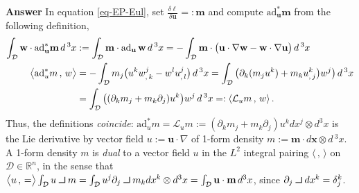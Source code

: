 \documentclass[11pt, oneside]{article}   	%
\def\contract{\makebox[1.2em][c]{\mbox{\rule{.6em}
{.01truein}\rule{.01truein}{.6em}}}}
\numberwithin{equation}{section}
\theoremstyle{plain}
\theoremstyle{definition}
\theoremstyle{remark}
\newcommand{\<}{\langle}
\renewcommand{\>}{\rangle}
\newcommand{\scp}[2]{{\big\langle {#1}\, , \, {#2}\big\rangle}}
\begin{document}
\textbf{Answer}
In equation \eqref{eq-EP-Eul}, set $\frac{\delta \ell}{\delta \mathbf{u}}=: \mathbf{m}$ and compute $\mathrm{ad}^*_{\mathbf{u}} \mathbf{m} $
from the following definition,
\begin{align*}
\int _{\cal D} \mathbf{w} \cdot \mathrm{ad}^*_{\mathbf{u}} \mathbf{m} \,d\,^3x
&:=
\int _{\cal D} \mathbf{m} \cdot {\mathrm{ad}_{\mathbf{u}}\,\mathbf{w}}  \,d\,^3x
 =
- \int _{\cal D} \mathbf{m} \cdot \big(\mathbf{u}\cdot\nabla \mathbf{w} - \mathbf{w}\cdot\nabla \mathbf{u} \big)\,d\,^3x
\\ \scp{  \mathrm{ad}^*_u m}{w}  & = 
- \int _{\cal D} m_j \big(u^k w_{,\,k}^j - w^lu_{,\,l}^j \big)\,d\,^3x
= \int _{\cal D} \big(\partial_k(m_j u^k) + m_k u_{,\,j}^k \big)w^j\big)\,d\,^3x
\\&= 
 \int _{\cal D} \big( (\partial_km_j + m_k \partial_j ) u^k  \big) w^j\,d\,^3x
 =:
  \langle  \mathcal{L}_u m\,,\,w\rangle
\,.\end{align*}
Thus, the definitions \emph{coincide}: $\mathrm{ad}^*_um = \mathcal{L}_um := (\partial_km_j + m_k \partial_j ) u^k dx^j \otimes d^3x$ 
is the Lie derivative by vector field $u:=\mathbf{u}\cdot \nabla$ of 1-form density $m:=\mathbf{m} \cdot d\mathbf{x} \otimes d\,^3x$.
A 1-form density $m$ is \emph{dual} to a vector field $u$ in the $L^2$ integral pairing $\scp{}{}$ on $\mathcal{D}\in \mathbb{R}^n$,
in the sense that $\scp{u} = \int_{\cal D} u\contract m =  \int_{\cal D} u^j\partial_j\contract m_kdx^k\otimes d^3x  =  \int_{\cal D} \mathbf{u}\cdot \mathbf{m}\,d^3x$, since $\partial_j \contract dx^k = \delta_j^k$. 
\end{document}

